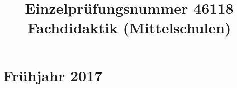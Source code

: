 \documentclass{lehramt-informatik-examen-sammlung}
\title{Einzelprüfungsnummer 46118\\Fachdidaktik (Mittelschulen)}
\begin{document}
\maketitle
\tableofcontents

\section{Frühjahr 2017}

\end{document}
